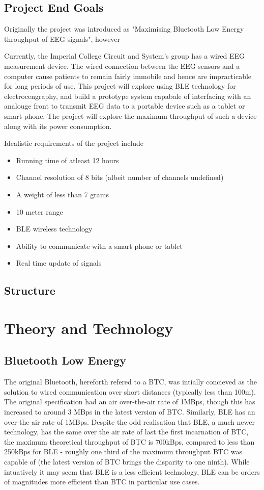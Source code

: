 \documentclass[]{article}
\begin{document}
\subsection{Project End Goals}
Originally the project was introduced as "Maximising Bluetooth Low Energy throughput of \ac{EEG} signals", however 

Currently, the Imperial College Circuit and System's group has a wired \ac{EEG} measurement device. The wired connection between the EEG sensors and a computer cause patients to remain fairly immobile and hence are impracticable for long periods of use. This project will explore using \ac{BLE} technology for electrocengraphy, and build a prototype system capabale of interfacing with an analouge front to transmit \ac{EEG} data to a portable device such as a tablet or smart phone.  The project will explore the maximum throughput of such a device along with its power consumption.

Idealistic requirements of the project include 
\begin{itemize}
	\item Running time of atleast 12 hours
	\item Channel resolution of 8 bits (albeit number of channels undefined)
	\item A weight of less than 7 grams
	\item 10 meter range
	\item BLE wireless technology
	\item Ability to communicate with a smart phone or tablet
	\item Real time update of signals
\end{itemize}

\subsection {Structure}

\clearpage
\section{Theory and Technology}
\subsection{Bluetooth Low Energy}
The original Bluetooth, hereforth refered to a \ac{BTC}, was intially concieved as the solution to wired communication over short distances (typically less than 100m). The original specification had an air over-the-air rate of 1MBps, though this has increased to around 3 MBps in the latest version of \ac{BTC}. Similarly, BLE has an over-the-air rate of 1MBps. Despite the odd realisation that \ac{BLE}, a much newer technology, has the same over the air rate of last the first incarnation of \ac{BTC}, the maximum theoretical throughput of \ac{BTC} is 700kBps, compared to less than 250kBps for \ac{BLE} - roughly one third of the maximum throughput \ac{BTC} was capable of (the latest version of \ac{BTC} brings the disparity to one ninth). While intuatively it may seem that \ac{BLE} is a less efficient technology, \ac{BLE} can be orders of magnitudes more efficient than \ac{BTC} in particular use cases.
\end{document}
